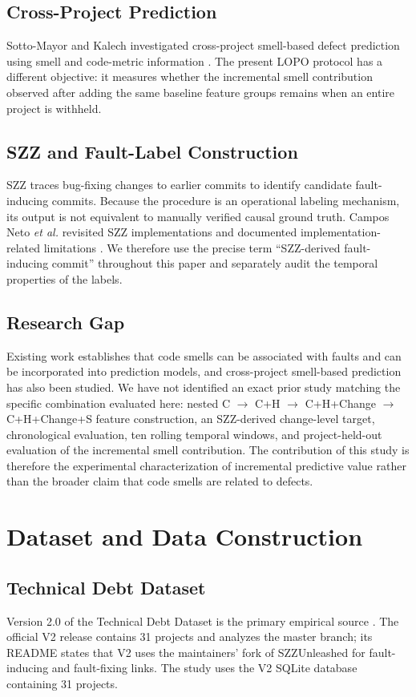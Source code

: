 \documentclass[conference]{IEEEtran}
\begin{document}
\subsection{Cross-Project Prediction}
Sotto-Mayor and Kalech investigated cross-project smell-based defect prediction using smell and code-metric information \cite{sottomayor2021cross}. The present LOPO protocol has a different objective: it measures whether the incremental smell contribution observed after adding the same baseline feature groups remains when an entire project is withheld.

\subsection{SZZ and Fault-Label Construction}
SZZ traces bug-fixing changes to earlier commits to identify candidate fault-inducing commits. Because the procedure is an operational labeling mechanism, its output is not equivalent to manually verified causal ground truth. Campos Neto \textit{et al.} revisited SZZ implementations and documented implementation-related limitations \cite{campos2019szz}. We therefore use the precise term ``SZZ-derived fault-inducing commit'' throughout this paper and separately audit the temporal properties of the labels.

\subsection{Research Gap}
Existing work establishes that code smells can be associated with faults and can be incorporated into prediction models, and cross-project smell-based prediction has also been studied. We have not identified an exact prior study matching the specific combination evaluated here: nested C $\rightarrow$ C+H $\rightarrow$ C+H+Change $\rightarrow$ C+H+Change+S feature construction, an SZZ-derived change-level target, chronological evaluation, ten rolling temporal windows, and project-held-out evaluation of the incremental smell contribution. The contribution of this study is therefore the experimental characterization of incremental predictive value rather than the broader claim that code smells are related to defects.

\section{Dataset and Data Construction}
\subsection{Technical Debt Dataset}
Version 2.0 of the Technical Debt Dataset is the primary empirical source \cite{lenarduzzi2019technical}. The official V2 release contains 31 projects and analyzes the master branch; its README states that V2 uses the maintainers' fork of SZZUnleashed for fault-inducing and fault-fixing links. The study uses the V2 SQLite database containing 31 projects.
\end{document}

